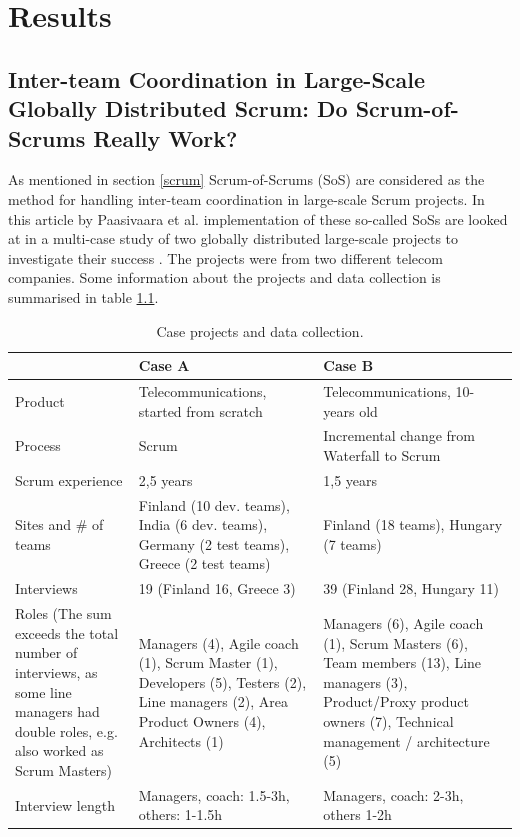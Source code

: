\chapter{Results}

\minitoc

\newpage

\section{Inter-team Coordination in Large-Scale Globally Distributed Scrum: Do Scrum-of-Scrums Really Work?}

As mentioned in section \ref{scrum} Scrum-of-Scrums (SoS) are considered as the method for handling inter-team coordination in large-scale Scrum projects. In this article by Paasivaara et al. implementation of these so-called SoSs are looked at in a multi-case study of two globally distributed large-scale projects to investigate their success \cite{Paasivaara2012}. The projects were from two different telecom companies. Some information about the projects and data collection is summarised in table \ref{cpadc}.

\begin{table}[H]
\begin{center}
    \begin{tabular}{| p{3.5cm} | p{5.5cm} | p{5.5cm} |}
    \hline
     & \textbf{Case A} & \textbf{Case B} \\ \hline
    Product & Telecommunications, started from scratch & Telecommunications, 10-years old \\ \hline
    Process & Scrum & Incremental change from Waterfall to Scrum  \\ \hline
    Scrum experience & 2,5 years & 1,5 years \\ \hline
    Sites and \# of teams & Finland (10 dev. teams), India (6 dev. teams), Germany (2 test teams), Greece (2 test teams) & Finland (18 teams), Hungary (7 teams) \\ \hline
    Interviews & 19 (Finland 16, Greece 3) & 39 (Finland 28, Hungary 11) \\ \hline
    Roles (The sum exceeds the total number of interviews, as some line managers had double roles, e.g. also worked as Scrum Masters) & Managers (4), Agile coach (1), Scrum Master (1), Developers (5), Testers (2), Line managers (2), Area Product Owners (4), Architects (1) & Managers (6), Agile coach (1), Scrum Masters (6), Team members (13), Line managers (3), Product/Proxy product owners (7), Technical management / architecture (5) \\ \hline
    Interview length & Managers, coach: 1.5-3h, others: 1-1.5h & Managers, coach: 2-3h, others 1-2h \\ \hline
    \end{tabular}
    \caption{Case projects and data collection.}
    \label{cpadc}
\end{center}
\end{table}

